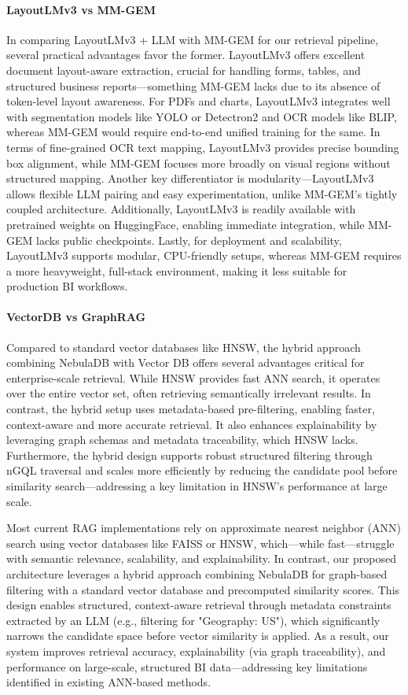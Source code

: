 \documentclass[11pt]{article}
\begin{document}
\paragraph{LayoutLMv3 vs MM-GEM}
In comparing LayoutLMv3 + LLM with MM-GEM for our retrieval pipeline, several practical advantages favor the former. LayoutLMv3 offers excellent document layout-aware extraction, crucial for handling forms, tables, and structured business reports—something MM-GEM lacks due to its absence of token-level layout awareness. For PDFs and charts, LayoutLMv3 integrates well with segmentation models like YOLO or Detectron2 and OCR models like BLIP, whereas MM-GEM would require end-to-end unified training for the same. In terms of fine-grained OCR text mapping, LayoutLMv3 provides precise bounding box alignment, while MM-GEM focuses more broadly on visual regions without structured mapping. Another key differentiator is modularity—LayoutLMv3 allows flexible LLM pairing and easy experimentation, unlike MM-GEM's tightly coupled architecture. Additionally, LayoutLMv3 is readily available with pretrained weights on HuggingFace, enabling immediate integration, while MM-GEM lacks public checkpoints. Lastly, for deployment and scalability, LayoutLMv3 supports modular, CPU-friendly setups, whereas MM-GEM requires a more heavyweight, full-stack environment, making it less suitable for production BI workflows.

\paragraph{VectorDB vs GraphRAG}
Compared to standard vector databases like HNSW, the hybrid approach combining NebulaDB with Vector DB offers several advantages critical for enterprise-scale retrieval. While HNSW provides fast ANN search, it operates over the entire vector set, often retrieving semantically irrelevant results. In contrast, the hybrid setup uses metadata-based pre-filtering, enabling faster, context-aware and more accurate retrieval. It also enhances explainability by leveraging graph schemas and metadata traceability, which HNSW lacks. Furthermore, the hybrid design supports robust structured filtering through nGQL traversal and scales more efficiently by reducing the candidate pool before similarity search—addressing a key limitation in HNSW’s performance at large scale.

Most current RAG implementations rely on approximate nearest neighbor (ANN) search using vector databases like FAISS or HNSW, which—while fast—struggle with semantic relevance, scalability, and explainability. In contrast, our proposed architecture leverages a hybrid approach combining NebulaDB for graph-based filtering with a standard vector database and precomputed similarity scores. This design enables structured, context-aware retrieval through metadata constraints extracted by an LLM (e.g., filtering for "Geography: US"), which significantly narrows the candidate space before vector similarity is applied. As a result, our system improves retrieval accuracy, explainability (via graph traceability), and performance on large-scale, structured BI data—addressing key limitations identified in existing ANN-based methods.
\end{document}
